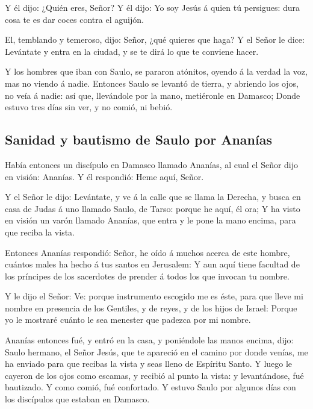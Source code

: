  Y él dijo: ¿Quién eres, Señor? Y él dijo: Yo soy Jesús á
quien tú persigues: dura cosa te es dar coces contra el aguijón.

 El, temblando y temeroso, dijo: Señor, ¿qué quieres que
haga? Y el Señor le dice: Levántate y entra en la ciudad, y se te dirá
lo que te conviene hacer.

 Y los hombres que iban con Saulo, se pararon atónitos,
oyendo á la verdad la voz, mas no viendo á nadie. 
Entonces Saulo se levantó de tierra, y abriendo los ojos, no veía á
nadie: así que, llevándole por la mano, metiéronle en Damasco;
 Donde estuvo tres días sin ver, y no comió, ni bebió.

\hypertarget{sanidad-y-bautismo-de-saulo-por-ananuxedas}{%
\subsection{Sanidad y bautismo de Saulo por
Ananías}\label{sanidad-y-bautismo-de-saulo-por-ananuxedas}}

 Había entonces un discípulo en Damasco llamado Ananías,
al cual el Señor dijo en visión: Ananías. Y él respondió: Heme aquí,
Señor.

 Y el Señor le dijo: Levántate, y ve á la calle que se
llama la Derecha, y busca en casa de Judas á uno llamado Saulo, de
Tarso: porque he aquí, él ora;  Y ha visto en visión un
varón llamado Ananías, que entra y le pone la mano encima, para que
reciba la vista.

 Entonces Ananías respondió: Señor, he oído á muchos
acerca de este hombre, cuántos males ha hecho á tus santos en Jerusalem:
 Y aun aquí tiene facultad de los príncipes de los
sacerdotes de prender á todos los que invocan tu nombre.

 Y le dijo el Señor: Ve: porque instrumento escogido me
es éste, para que lleve mi nombre en presencia de los Gentiles, y de
reyes, y de los hijos de Israel:  Porque yo le mostraré
cuánto le sea menester que padezca por mi nombre.

 Ananías entonces fué, y entró en la casa, y poniéndole
las manos encima, dijo: Saulo hermano, el Señor Jesús, que te apareció
en el camino por donde venías, me ha enviado para que recibas la vista y
seas lleno de Espíritu Santo.  Y luego le cayeron de los
ojos como escamas, y recibió al punto la vista: y levantándose, fué
bautizado.  Y como comió, fué confortado. Y estuvo Saulo
por algunos días con los discípulos que estaban en Damasco.

